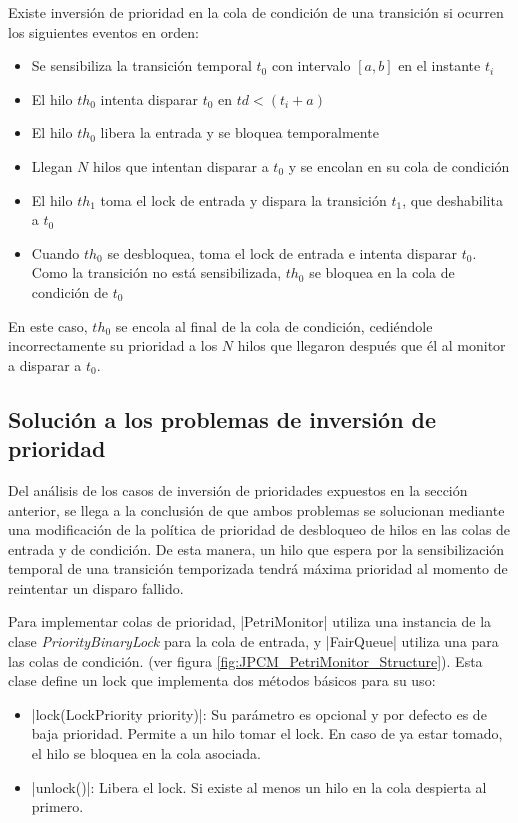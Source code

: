 Existe inversión de prioridad en la cola de condición de una transición si
ocurren los siguientes eventos en orden:
\begin{itemize}
  \item Se sensibiliza la transición temporal $t_{0}$ con intervalo $[a,b]$ en
  el instante $t_{i}$
  \item El hilo $th_{0}$ intenta disparar $t_{0}$ en $td < (t_{i} + a)$
  \item El hilo $th_{0}$ libera la entrada y se bloquea temporalmente
  \item Llegan $N$ hilos que intentan disparar a $t_{0}$ y se encolan en su cola
  de condición
  \item El hilo $th_{1}$ toma el lock de entrada y dispara la transición
  $t_{1}$, que deshabilita a $t_{0}$
  \item Cuando $th_{0}$ se desbloquea, toma el lock de entrada e intenta
  disparar $t_{0}$. Como la transición no está sensibilizada, $th_{0}$ se
  bloquea en la cola de condición de $t_{0}$
\end{itemize}
 
En este caso, $th_{0}$ se encola al final de la cola de condición, cediéndole
incorrectamente su prioridad a los $N$ hilos que llegaron después que él al
monitor a disparar a $t_{0}$.

\subsection{Solución a los problemas de inversión de prioridad}
\label{JPCM_solucion_inv_prioridad}

Del análisis de los casos de inversión de prioridades expuestos en la sección
anterior, se llega a la conclusión de que ambos problemas se solucionan mediante
una modificación de la política de prioridad de desbloqueo de hilos en las colas
de entrada y de condición. De esta manera, un hilo que espera por la
sensibilización temporal de una transición temporizada tendrá máxima prioridad
al momento de reintentar un disparo fallido.

Para implementar colas de prioridad, |PetriMonitor| utiliza una
instancia de la clase \textit{PriorityBinaryLock} para la cola de entrada, y
|FairQueue| utiliza una para las colas de condición. (ver figura
\ref{fig:JPCM_PetriMonitor_Structure}).
Esta clase define un lock que implementa dos métodos básicos para su uso:
\begin{itemize}
  \item {}|lock(LockPriority priority)|: Su parámetro es opcional y por
  defecto es de baja prioridad. Permite a un hilo tomar el lock. En caso de ya
  estar tomado, el hilo se bloquea en la cola asociada.
  \item {}|unlock()|: Libera el lock. Si existe al menos un hilo en la
  cola despierta al primero.
\end{itemize}

